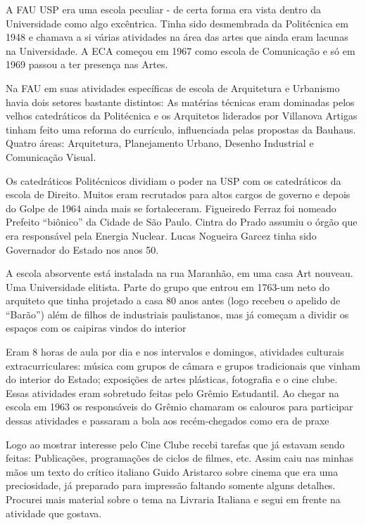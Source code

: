 A FAU USP era uma escola peculiar - de certa forma era vista dentro da
Universidade como algo excêntrica. Tinha sido desmembrada da Politécnica
em 1948 e chamava a si várias atividades na área das artes que ainda
eram lacunas na Universidade. A ECA começou em 1967 como escola de
Comunicação e só em 1969 passou a ter presença nas Artes.

Na FAU em suas atividades específicas de escola de Arquitetura e
Urbanismo havia dois setores bastante distintos: As matérias técnicas
eram dominadas pelos velhos catedráticos da Politécnica e os Arquitetos
liderados por Villanova Artigas tinham feito uma reforma do currículo,
influenciada pelas propostas da Bauhaus. Quatro áreas: Arquitetura,
Planejamento Urbano, Desenho Industrial e Comunicação Visual.

Os catedráticos Politécnicos dividiam o poder na USP com os catedráticos
da escola de Direito. Muitos eram recrutados para altos cargos de
governo e depois do Golpe de 1964 ainda mais se fortaleceram. Figueiredo
Ferraz foi nomeado Prefeito “biônico” da Cidade de São Paulo. Cintra do
Prado assumiu o órgão que era responsável pela Energia Nuclear. Lucas
Nogueira Garcez tinha sido Governador do Estado nos anos 50.

A escola absorvente está instalada na rua Maranhão, em uma casa Art
nouveau. Uma Universidade elitista. Parte do grupo que entrou em 1763-um
neto do arquiteto que tinha projetado a casa 80 anos antes (logo recebeu
o apelido de “Barão”) além de filhos de industriais paulistanos, mas já
começam a dividir os espaços com os caipiras vindos do interior

Eram 8 horas de aula por dia e nos intervalos e domingos, atividades
culturais extracurriculares: música com grupos de câmara e grupos
tradicionais que vinham do interior do Estado; exposições de artes
plásticas, fotografia e o cine clube. Essas atividades eram sobretudo
feitas pelo Grêmio Estudantil. Ao chegar na escola em 1963 os
responsáveis do Grêmio chamaram os calouros para participar dessas
atividades e passaram a bola aos recém-chegados como era de praxe

Logo ao mostrar interesse pelo Cine Clube recebi tarefas que já estavam
sendo feitas: Publicações, programações de ciclos de filmes, etc. Assim
caiu nas minhas mãos um texto do crítico italiano Guido Aristarco sobre
cinema que era uma preciosidade, já preparado para impressão faltando
somente alguns detalhes. Procurei mais material sobre o tema na Livraria
Italiana e segui em frente na atividade que gostava.

